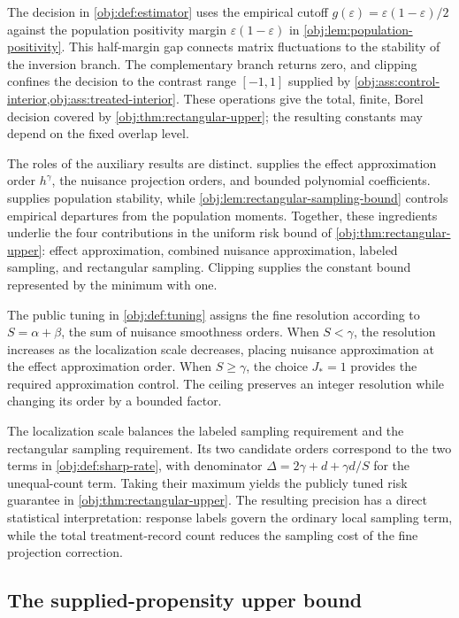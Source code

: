 \documentclass[11pt]{article}
\begin{document}
The decision in \cref{obj:def:estimator} uses the empirical cutoff \(g(\varepsilon)=\varepsilon(1-\varepsilon)/2\) against the population positivity margin \(\varepsilon(1-\varepsilon)\) in \cref{obj:lem:population-positivity}. This half-margin gap connects matrix fluctuations to the stability of the inversion branch. The complementary branch returns zero, and clipping confines the decision to the contrast range \([-1,1]\) supplied by \cref{obj:ass:control-interior,obj:ass:treated-interior}. These operations give the total, finite, Borel decision covered by \cref{obj:thm:rectangular-upper}; the resulting constants may depend on the fixed overlap level.

The roles of the auxiliary results are distinct.  supplies the effect approximation order \(h^\gamma\), the nuisance projection orders, and bounded polynomial coefficients.  supplies population stability, while \cref{obj:lem:rectangular-sampling-bound} controls empirical departures from the population moments. Together, these ingredients underlie the four contributions in the uniform risk bound of \cref{obj:thm:rectangular-upper}: effect approximation, combined nuisance approximation, labeled sampling, and rectangular sampling. Clipping supplies the constant bound represented by the minimum with one.

The public tuning in \cref{obj:def:tuning} assigns the fine resolution according to \(S=\alpha+\beta\), the sum of nuisance smoothness orders. When \(S<\gamma\), the resolution increases as the localization scale decreases, placing nuisance approximation at the effect approximation order. When \(S\ge\gamma\), the choice \(J_*=1\) provides the required approximation control. The ceiling preserves an integer resolution while changing its order by a bounded factor.

The localization scale balances the labeled sampling requirement and the rectangular sampling requirement. Its two candidate orders correspond to the two terms in \cref{obj:def:sharp-rate}, with denominator \(\Delta=2\gamma+d+\gamma d/S\) for the unequal-count term. Taking their maximum yields the publicly tuned risk guarantee in \cref{obj:thm:rectangular-upper}. The resulting precision has a direct statistical interpretation: response labels govern the ordinary local sampling term, while the total treatment-record count reduces the sampling cost of the fine projection correction.

\subsection{The supplied-propensity upper bound}
\end{document}
